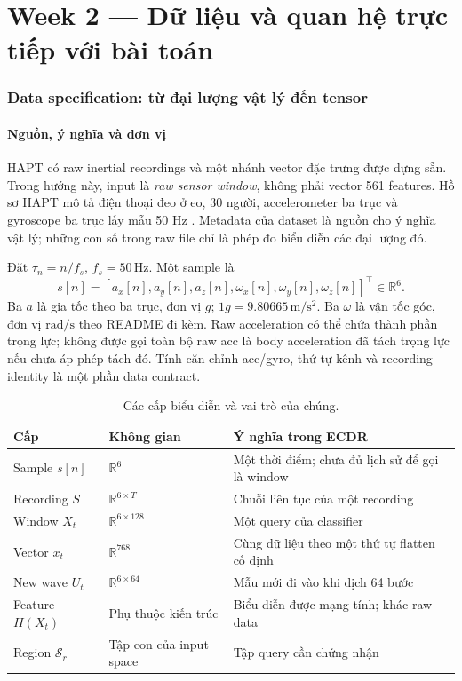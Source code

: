 \documentclass[11pt,a4paper]{article}
\newcommand{\R}{\mathbb R}
\newcommand{\Sset}{\mathcal S}
\theoremstyle{remark}
\begin{document}
\clearpage
\part{Week 2 --- Dữ liệu và quan hệ trực tiếp với bài toán}
\section{Data specification: từ đại lượng vật lý đến tensor}
\subsection{Nguồn, ý nghĩa và đơn vị}
HAPT có raw inertial recordings và một nhánh vector đặc trưng được dựng sẵn.
Trong hướng này, input là \emph{raw sensor window}, không phải vector
561 features. Hồ sơ HAPT mô tả điện thoại đeo ở eo, 30 người, accelerometer
ba trục và gyroscope ba trục lấy mẫu 50 Hz \cite{hapt}. Metadata của dataset
là nguồn cho ý nghĩa vật lý; những con số trong raw file chỉ là phép đo
biểu diễn các đại lượng đó.

Đặt $\tau_n=n/f_s$, $f_s=50\,\mathrm{Hz}$. Một sample là
\begin{equation}
 s[n]=[a_x[n],a_y[n],a_z[n],\omega_x[n],\omega_y[n],\omega_z[n]]^\top
 \in\R^6.
 \label{eq:sample}
\end{equation}
Ba $a$ là gia tốc theo ba trục, đơn vị $g$; $1g=9.80665\,\mathrm{m/s^2}$.
Ba $\omega$ là vận tốc góc, đơn vị $\mathrm{rad/s}$ theo README đi kèm.
Raw acceleration có thể chứa thành phần trọng lực; không được gọi toàn bộ
raw acc là body acceleration đã tách trọng lực nếu chưa áp phép tách đó.
Tính căn chỉnh acc/gyro, thứ tự kênh và recording identity là một phần data
contract.

\begin{table}[htbp]\centering
\caption{Các cấp biểu diễn và vai trò của chúng.}
\begin{tabularx}{\linewidth}{@{}p{2.3cm}p{3.1cm}Y@{}}\toprule
Cấp & Không gian & Ý nghĩa trong ECDR\\\midrule
Sample $s[n]$ & $\R^6$ & Một thời điểm; chưa đủ lịch sử để gọi là window\\
Recording $S$ & $\R^{6\times T}$ & Chuỗi liên tục của một recording\\
Window $X_t$ & $\R^{6\times128}$ & Một query của classifier\\
Vector $x_t$ & $\R^{768}$ & Cùng dữ liệu theo một thứ tự flatten cố định\\
New wave $U_t$ & $\R^{6\times64}$ & Mẫu mới đi vào khi dịch 64 bước\\
Feature $H(X_t)$ & Phụ thuộc kiến trúc & Biểu diễn được mạng tính; khác raw data\\
Region $\Sset_r$ & Tập con của input space & Tập query cần chứng nhận\\\bottomrule
\end{tabularx}
\end{table}
\end{document}

